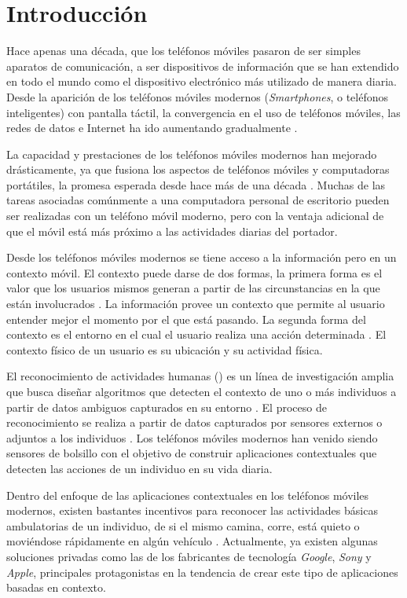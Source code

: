 
\chapter{Introducción}

\label{chap1:introduccion}

Hace apenas una década, que los teléfonos móviles pasaron de ser simples
aparatos de comunicación, a ser dispositivos de información que se
han extendido en todo el mundo como el dispositivo electrónico más
utilizado de manera diaria. Desde la aparición de los teléfonos móviles
modernos (\emph{Smartphones}, o teléfonos inteligentes) con pantalla
táctil, la convergencia en el uso de teléfonos móviles, las redes
de datos e Internet ha ido aumentando gradualmente \cite{Fling2009}.

La capacidad y prestaciones de los teléfonos móviles modernos han
mejorado drásticamente, ya que fusiona los aspectos de teléfonos móviles
y computadoras portátiles, la promesa esperada desde hace más de una
década \cite{Tanenbaum2010}. Muchas de las tareas asociadas comúnmente
a una computadora personal de escritorio pueden ser realizadas con
un teléfono móvil moderno, pero con la ventaja adicional de que el
móvil está más próximo a las actividades diarias del portador.

Desde los teléfonos móviles modernos se tiene acceso a la información
pero en un contexto móvil. El contexto puede darse de dos formas,
la primera forma es el valor que los usuarios mismos generan a partir
de las circunstancias en la que están involucrados \cite{Fling2009}.
La información provee un contexto que permite al usuario entender
mejor el momento por el que está pasando. La segunda forma del contexto
es el entorno en el cual el usuario realiza una acción determinada
\cite{Fling2009}. El contexto físico de un usuario es su ubicación
y su actividad física. 

El reconocimiento de actividades humanas () es un línea
de investigación amplia que busca diseñar algoritmos que detecten
el contexto de uno o más individuos a partir de datos ambiguos capturados
en su entorno \cite{Bao2004}. El proceso de reconocimiento se realiza
a partir de datos capturados por sensores externos o adjuntos a los
individuos \cite{LaraLabrador2013,Chen2012}. Los teléfonos móviles
modernos han venido siendo sensores de bolsillo con el objetivo de
construir aplicaciones contextuales que detecten las acciones de un
individuo en su vida diaria. 

Dentro del enfoque de las aplicaciones contextuales en los teléfonos
móviles modernos, existen bastantes incentivos para reconocer las
actividades básicas ambulatorias de un individuo, de si el mismo camina,
corre, está quieto o moviéndose rápidamente en algún vehículo \cite{CampuzanoLopez2015,Google2013l}.
Actualmente, ya existen algunas soluciones privadas como las de los
fabricantes de tecnología \emph{Google}, \emph{Sony} y \emph{Apple},
principales protagonistas en la tendencia de crear este tipo de aplicaciones
basadas en contexto.

